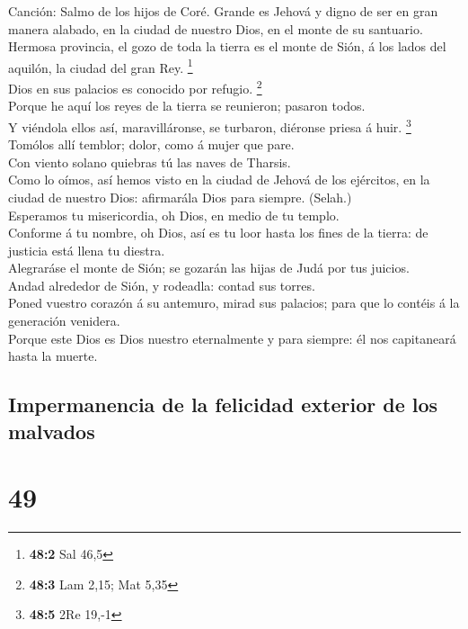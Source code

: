  Canción: Salmo de los hijos de Coré. Grande es Jehová y
digno de ser en gran manera alabado, en la ciudad de nuestro Dios, en el
monte de su santuario.\\
 Hermosa provincia, el gozo de toda la tierra es el monte de
Sión, á los lados del aquilón, la ciudad del gran Rey. \footnote{\textbf{48:2}
  Sal 46,5}\\
 Dios en sus palacios es conocido por refugio. \footnote{\textbf{48:3}
  Lam 2,15; Mat 5,35}\\
 Porque he aquí los reyes de la tierra se reunieron; pasaron
todos.\\
 Y viéndola ellos así, maravilláronse, se turbaron, diéronse
priesa á huir. \footnote{\textbf{48:5} 2Re 19,-1}\\
 Tomólos allí temblor; dolor, como á mujer que pare.\\
 Con viento solano quiebras tú las naves de Tharsis.\\
 Como lo oímos, así hemos visto en la ciudad de Jehová de
los ejércitos, en la ciudad de nuestro Dios: afirmarála Dios para
siempre. (Selah.)\\
 Esperamos tu misericordia, oh Dios, en medio de tu
templo.\\
 Conforme á tu nombre, oh Dios, así es tu loor hasta los
fines de la tierra: de justicia está llena tu diestra.\\
 Alegraráse el monte de Sión; se gozarán las hijas de Judá
por tus juicios.\\
 Andad alrededor de Sión, y rodeadla: contad sus torres.\\
 Poned vuestro corazón á su antemuro, mirad sus palacios;
para que lo contéis á la generación venidera.\\
 Porque este Dios es Dios nuestro eternalmente y para
siempre: él nos capitaneará hasta la muerte.

\hypertarget{impermanencia-de-la-felicidad-exterior-de-los-malvados}{%
\subsection{Impermanencia de la felicidad exterior de los
malvados}\label{impermanencia-de-la-felicidad-exterior-de-los-malvados}}

\hypertarget{section-48}{%
\section{49}\label{section-48}}

